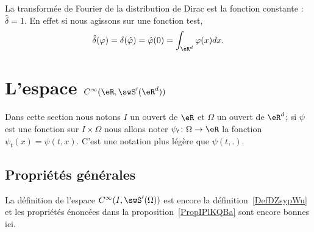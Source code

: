 \begin{example}
    La transformée de Fourier de la distribution de Dirac est la fonction constante : \( \hat \delta=1\). En effet si nous agissons sur une fonction test,
    \begin{equation}
        \hat \delta(\varphi)=\delta(\hat \varphi)=\hat \varphi(0)=\int_{\eR^d}\varphi(x)dx.
    \end{equation}
\end{example}

\section{L'espace \texorpdfstring{$  C^{\infty}(\eR,\swS'(\eR^d))$}{C(R,S')}}

Dans cette section nous notons \( I\) un ouvert de \( \eR\) et \( \Omega\) un ouvert de \( \eR^d\); si \( \psi\) est une fonction sur \( I\times \Omega\) nous allons noter \( \psi_t\colon \Omega\to \eR\) la fonction \( \psi_t(x)=\psi(t,x)\). C'est une notation plus légère que \( \psi(t,.)\).

\subsection{Propriétés générales}

La définition de l'espace \(  C^{\infty}(I,\swS'(\Omega))\) est encore la définition~\ref{DefDZsypWu} et les propriétés énoncées dans la proposition~\ref{PropIPlKQBa} sont encore bonnes ici.

